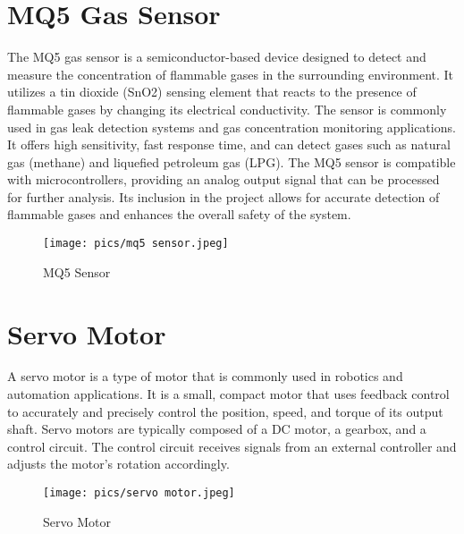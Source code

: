 \documentclass[a4paper,12pt]{report}
\begin{document}
\begin{}
 
\section{MQ5 Gas Sensor}
 The MQ5 gas sensor is a semiconductor-based device designed to detect and measure the
concentration of flammable gases in the surrounding environment. It utilizes a tin dioxide (SnO2)
sensing element that reacts to the presence of flammable gases by changing its electrical
conductivity. The sensor is commonly used in gas leak detection systems and gas concentration
monitoring applications. It offers high sensitivity, fast response time, and can detect gases such as
natural gas (methane) and liquefied petroleum gas (LPG). The MQ5 sensor is compatible with
microcontrollers, providing an analog output signal that can be processed for further analysis. Its
inclusion in the project allows for accurate detection of flammable gases and enhances the overall
safety of the system.
\begin{center}
    \begin{figure}[!hbt]
    \texttt{[image: pics/mq5 sensor.jpeg]}
    \centering
    \caption{MQ5 Sensor}
    \label{fig:}
    \end{figure}
\end{center}

\section{Servo Motor}
A servo motor is a type of motor that is commonly used in robotics and automation applications.
It is a small, compact motor that uses feedback control to accurately and precisely control the
position, speed, and torque of its output shaft. Servo motors are typically composed of a DC
motor, a gearbox, and a control circuit. The control circuit receives signals from an external
controller and adjusts the motor's rotation accordingly.
\begin{center}
    \begin{figure}[!hbt]
    \texttt{[image: pics/servo motor.jpeg]}
    \centering
    \caption{Servo Motor}
    \label{fig:}
    \end{figure}
\end{center}


\end{}
\end{document}
